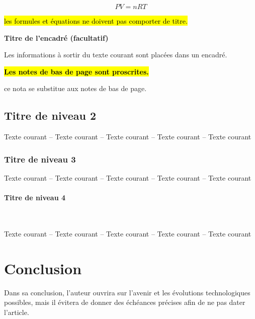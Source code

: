 \documentclass[a4paper,12pt]{article}
\begin{document}
\begin{equation}
	PV=nRT
	\label{eq:eq1}
\end{equation}
\begin{Remark}%
	\hl{ les formules et \'equations ne doivent pas comporter de titre.}\newline\newline
\end{Remark}


\begin{Cadre}
	\begin{center}
		\textbf{Titre de l'encadr\'e (facultatif)}
	\end{center}
	Les informations \`a sortir du texte courant sont plac\'ees dans un encadr\'e.
\end{Cadre}

\hl{\textbf{Les notes de bas de page sont proscrites.}}%

\begin{Nota}
	ce nota se substitue aux notes de bas de page.
\end{Nota}


\subsection{Titre de niveau 2}\label{sec:niveau2}
Texte courant --  Texte courant -- Texte courant -- Texte courant -- Texte courant

\subsubsection{Titre de niveau 3}\label{sec:niveau3}
Texte courant --  Texte courant -- Texte courant -- Texte courant -- Texte courant

\paragraph{Titre de niveau 4}\label{sec:niveau4}~\par
Texte courant --  Texte courant -- Texte courant -- Texte courant -- Texte courant\newline



\section*{Conclusion}
Dans sa conclusion, l'auteur ouvrira sur l'avenir et les \'evolutions technologiques possibles, mais il \'evitera de donner des \'ech\'eances pr\'ecises afin de ne pas dater l'article.
\end{document}
